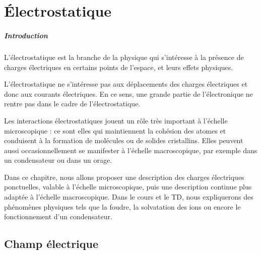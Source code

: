 \documentclass[11pt,fleqn]{book} %
\begin{document}








\setcounter{chapter}{2}

\chapter{\'{E}lectrostatique}

\paragraph{Introduction}

L'électrostatique est la branche de la physique qui s'intéresse à la présence de charges électriques en certains points de l'espace, et leurs effets physiques.

L'électrostatique ne s'intéresse pas aux déplacements des charges électriques et donc aux courants électriques. En ce sens, une grande partie de l'électronique ne rentre pas dans le cadre de l'électrostatique.

Les interactions électrostatiques jouent un rôle très important à l'échelle microscopique : ce sont elles qui maintiennent la cohésion des atomes et conduisent à la formation de molécules ou de solides cristallins. Elles peuvent aussi occasionnellement se manifester à l'échelle macroscopique, par exemple dans un condensateur ou dans un orage.

Dans ce chapitre, nous allons proposer une description des charges électriques ponctuelles, valable à l'échelle microscopique, puis une description continue plus adaptée à l'échelle macroscopique. Dans le cours et le TD, nous expliquerons des phénomènes physiques tels que la foudre, la solvatation des ions ou encore le fonctionnement d'un condensateur.

\section{Champ électrique}
\end{document}
